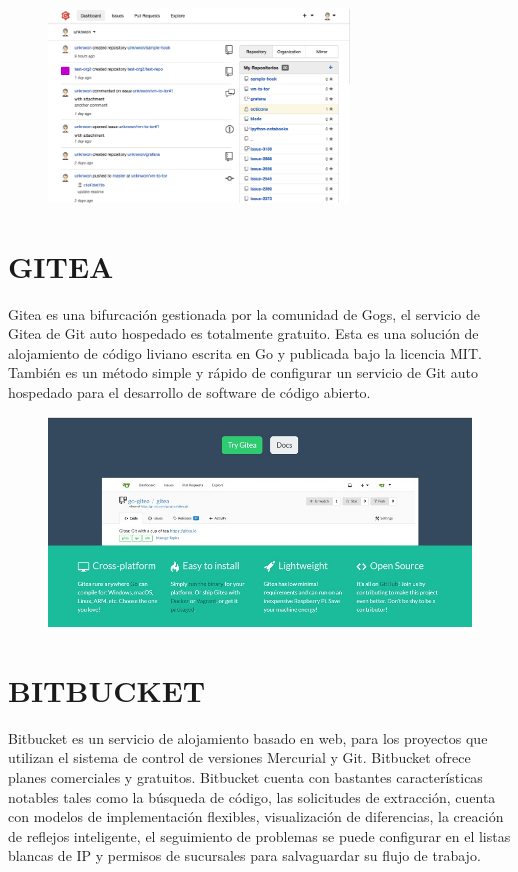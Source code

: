 \documentclass[12pt,letterpaper]{article}
\begin{document}
\begin{figure}[htb]
\begin{center}
\includegraphics[width=8cm]{./Imagenes/gogs}
\end{center}
\end{figure}

\section{GITEA}
Gitea es una bifurcación gestionada por la comunidad de Gogs, el servicio de Gitea de Git auto hospedado es totalmente gratuito. Esta es una solución de alojamiento de código liviano escrita en Go y publicada bajo la licencia MIT.
También es un método simple y rápido de configurar un servicio de Git auto hospedado para el desarrollo de software de código abierto.

\vspace*{-0.025in}
\begin{figure}[htb]
\begin{center}
\includegraphics[width=16cm]{./Imagenes/gitea}
\end{center}
\end{figure}

\section{BITBUCKET}
Bitbucket es un servicio de alojamiento basado en web, para los proyectos que utilizan el sistema de control de versiones Mercurial y Git. Bitbucket ofrece planes comerciales y gratuitos.
Bitbucket cuenta con bastantes características notables tales como la búsqueda de código, las solicitudes de extracción, cuenta con modelos de implementación flexibles, visualización de diferencias, la creación de reflejos inteligente, el seguimiento de problemas se puede configurar en el listas blancas de IP y permisos de sucursales para salvaguardar su flujo de trabajo.
\end{document}
